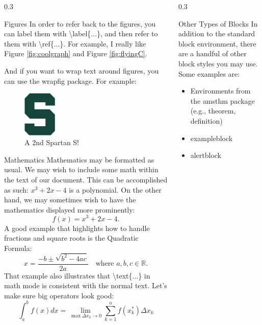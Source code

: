 \documentclass{msuposter}
\newcommand{\colwidth}{0.3\linewidth}
\begin{document}
\begin{frame}{}
\begin{columns}[t]
\begin{column}{\colwidth}
\begin{block}{Figures}
In order to refer back to the figures, you can label them with {\ttfamily\textbackslash label\{...\}}, and then refer to them with {\ttfamily\textbackslash ref\{...\}}.  For example, I really like Figure \ref{fig:coolgraph} and Figure \ref{fig:flyingC}.

And if you want to wrap text around figures, you can use the {\ttfamily wrapfig} package.  For example:

\begin{figure}
  \centering
    \includegraphics[width=0.25\textwidth]{spartans.jpg}
  \caption{A 2nd Spartan S!}
\end{figure}

\lipsum[1] %
\end{block}

\begin{block}{Mathematics}
Mathematics may be formatted as usual.  We may wish to include some math within the text of our document.  This can be accomplished as such: $x^{3} + 2x - 4$ is a polynomial.  On the other hand, we may sometimes wish to have the mathematics displayed more prominently:
\[
  f(x) = x^{3} + 2x - 4.
\]
A good example that highlights how to handle fractions and square roots is the Quadratic Formula:
\[
  x = \frac{-b \pm \sqrt{b^{2} - 4ac}}{2a} \quad\text{where } a,b,c \in \mathbb{R}.
\]
That example also illustrates that {\ttfamily \textbackslash text\{...\}} in math mode is consistent with the normal text.  Let's make sure big operators look good:
\[
  \int_{a}^{b} f(x) dx = \lim_{\max \Delta x_{k} \to 0} \sum_{k=1}^{n} f(x_{k}^{*}) \Delta x_{k}
\]
\end{block}

\end{column}


\begin{column}{\colwidth}

\begin{block}{Other Types of Blocks}
In addition to the standard {\ttfamily block} environment, there are a handful of other block styles you may use.  Some examples are:
\begin{itemize}
 \item Environments from the {\ttfamily amsthm} package (e.g., {\ttfamily theorem}, {\ttfamily definition})
 \item {\ttfamily exampleblock}
 \item {\ttfamily alertblock}
\end{itemize}
\end{block}


\end{column}
\end{columns}
\end{frame}
\end{document}
